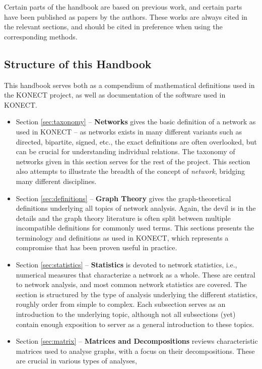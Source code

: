 \documentclass{article}
\begin{document}
Certain parts of the handbook are based on previous work, and certain
parts have been published as papers by the authors.  These works are
always cited in the relevant sections, and should be cited in preference
when using the corresponding methods. 

\subsection{Structure of this Handbook}
This handbook serves both as a compendium of mathematical definitions
used in the KONECT project, as well as documentation of the software
used in KONECT. 
\begin{itemize}
\item Section \ref{sec:taxonomy} -- \textbf{Networks} gives the basic
  definition of a network as used in KONECT -- as networks exists in
  many different variants such as directed, bipartite, signed, etc., the
  exact definitions are often overlooked, but can be crucial for
  understanding individual relations. The taxonomy of networks given in
  this section serves for the rest of the project.  This section also
  attempts to illustrate the breadth of the concept of \emph{network},
  bridging many different disciplines. 
\item Section \ref{sec:definitions} -- \textbf{Graph Theory} gives the
  graph-theoretical definitions underlying all topics of network analysis.  Again,
  the devil is in the details and the graph theory literature is often
  split between multiple incompatible definitions for commonly used
  terms.  This sections presents the terminology and definitions as used
  in KONECT, which represents a compromise that has been proven useful
  in practice. 
\item Section \ref{sec:statistics} -- \textbf{Statistics} is devoted to
  network statistics, i.e., numerical measures that characterize a
  network as a whole.  These are central to network analysis, and most
  common network statistics are covered.  The section is structured by
  the type of analysis underlying the different statistics, roughly
  order from simple to complex.  Each subsection serves as an
  introduction to the underlying topic, although not all subsections
  (yet) contain enough exposition to server as a general introduction to
  these topics. 
\item Section \ref{sec:matrix} -- \textbf{Matrices and Decompositions} reviews
  characteristic matrices used to analyse graphs, with a focus on their
  decompositions.  These are crucial in various types of analyses,

\end{itemize}
\end{document}
